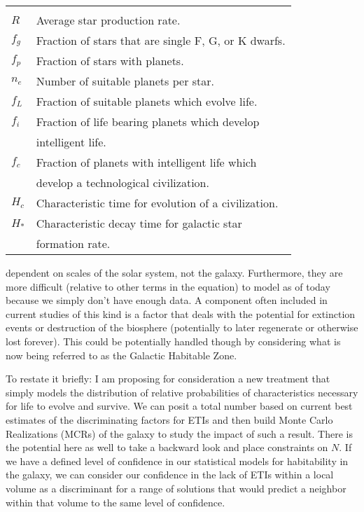 \documentclass[10pt,a4paper,final]{article}
\numberwithin{equation}{section}
\newenvironment{Table}
  {\par\bigskip\noindent\minipage{\columnwidth}\centering}
    {\endminipage\par\bigskip}
\begin{document}
\begin{multicols}{2}[]
			\begin{Table}
			\begin{tabular}{ll} \hline\hline
				& \\
				$R$   & Average star production rate.\\
				$f_g$ & Fraction of stars that are single F, G, or K dwarfs.\\
				$f_p$ & Fraction of stars with planets.\\
				$n_e$ & Number of suitable planets per star.\\
				$f_L$ & Fraction of suitable planets which evolve life.\\
				$f_i$ & Fraction of life bearing planets which develop\\
					& intelligent life.\\
				$f_c$ & Fraction of planets with intelligent life which\\
					& develop a technological civilization.\\
				$H_c$ & Characteristic time for evolution of a civilization.\\
				$H_*$ & Characteristic decay time for galactic star\\
					& formation rate.
			\end{tabular}
			\label{Table:params}
			\end{Table}
			
			\noindent
			dependent on scales of the solar system, not the galaxy. Furthermore, they are more
			difficult (relative to other terms in the equation) to model as of today because
			we simply don't have enough data. A component often included in current studies
			of this kind is a factor that deals with the potential for extinction events or
			destruction of the biosphere (potentially to later regenerate or otherwise lost
			forever). This could be potentially handled though by considering what is now
			being referred to as the Galactic Habitable Zone.
			
			To restate it briefly: I am proposing for consideration a new treatment that simply
			models the distribution of relative probabilities of characteristics necessary for
			life to evolve and survive. We can posit a total number based on current best estimates
			of the discriminating factors for ETIs and then build Monte Carlo Realizations (MCRs) of
			the galaxy to study the impact of such a result. There is the potential here as well
			to take a backward look  and place constraints on $N$. If we have a defined level of 
			confidence in our statistical models for habitability in the galaxy, we can consider 
			our confidence
			in the lack of ETIs within a local volume as a discriminant for a range of solutions that
			would predict a neighbor within that volume to the same level of confidence.


\end{multicols}
\end{document}
